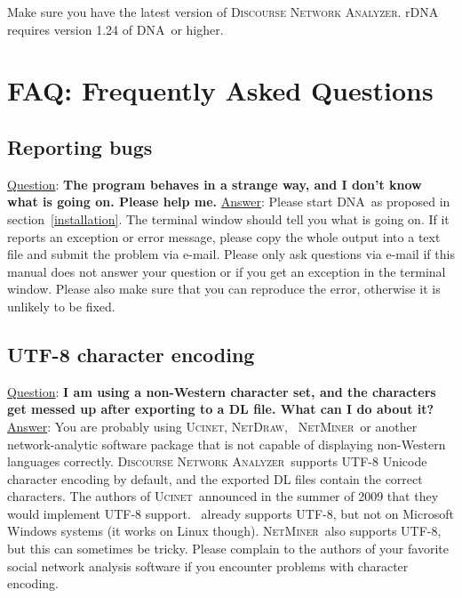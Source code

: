 \documentclass[12pt,a4paper]{scrreprt}
\newcommand{\visone}
{\textsf%
 {\protect\raisebox{.5ex}{\color[rgb]{0.1,0.1,0.1}v}%
  \protect\raisebox{.1ex}{\color[rgb]{0.3,0.3,0.3}i}%
  \protect\raisebox{-.1ex}{\color[rgb]{0.1,0.1,0.1}s}%
  \protect\raisebox{.1ex}{\color[rgb]{0.3,0.3,0.3}o}%
  \protect\raisebox{-.1ex}{\color[rgb]{0.1,0.1,0.1}n}%
  \protect\raisebox{-.4ex}{\color[rgb]{0.3,0.3,0.3}e}%
 }%
}
\newcommand{\ucinet}{\textsc{Ucinet}}
\newcommand{\netdraw}{\textsc{NetDraw}}
\newcommand{\dnalong}{\textsc{Discourse} \textsc{Network} \textsc{Analyzer}}
\newcommand{\dnashort}{\textsc{DNA}}
\newcommand{\netminer}{\textsc{NetMiner}}
\begin{document}
Make sure you have the latest version of \dnalong. rDNA requires version 1.24 of \dnashort\ or higher.

\chapter{FAQ: Frequently Asked Questions}\label{faq}

\section{Reporting bugs}
\underline{Question}: \textbf{The program behaves in a strange way, and I don't know what is going on. Please help me.}
\vspace{0.3cm} \newline
\underline{Answer}: Please start \dnashort\ as proposed in section~\ref{installation}. The terminal window should tell you what is going on. If it reports an exception or error message, please copy the whole output into a text file and submit the problem via e-mail. Please only ask questions via e-mail if this manual does not answer your question or if you get an exception in the terminal window. Please also make sure that you can reproduce the error, otherwise it is unlikely to be fixed.

\section{UTF-8 character encoding}
\underline{Question}: \textbf{I am using a non-Western character set, and the characters get messed up after exporting to a DL file. What can I do about it?}
\vspace{0.3cm} \newline
\underline{Answer}: You are probably using \ucinet, \netdraw, \visone\, \netminer\ or another network-analytic software package that is not capable of displaying non-Western languages correctly. \dnalong\ supports UTF-8 Unicode character encoding by default, and the exported DL files contain the correct characters. The authors of \ucinet\ announced in the summer of 2009 that they would implement UTF-8 support. \visone\ already supports UTF-8, but not on Microsoft Windows systems (it works on Linux though). \netminer\ also supports UTF-8, but this can sometimes be tricky. Please complain to the authors of your favorite social network analysis software if you encounter problems with character encoding.
\end{document}
